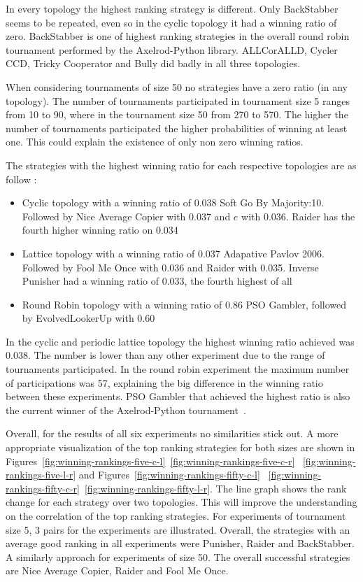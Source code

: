 In every topology the highest ranking strategy is different.
Only BackStabber seems to be repeated, even so in the cyclic
topology it had a winning ratio of zero. BackStabber is one of highest ranking
strategies in the overall round robin tournament performed by the Axelrod-Python
library. ALLCorALLD, Cycler CCD, Tricky Cooperator and Bully did badly in all
three topologies.

When considering tournaments of size 50 no strategies have a zero ratio
(in any topology). The number of tournaments participated in tournament size 5
ranges from 10 to 90, where in the tournament size 50 from 270 to 570. The higher
the number of tournaments participated the higher probabilities of winning at
least one. This could explain the existence of only non zero winning ratios.

The strategies with the highest winning ratio for each respective topologies are
as follow :

\begin{itemize}
	\item Cyclic topology with a winning ratio of 0.038 Soft Go By Majority:10.
	      Followed by Nice Average Copier with 0.037 and \(e\) with 0.036. Raider
	      has the fourth higher winning ratio on 0.034
	\item Lattice topology with a winning ratio of 0.037 Adapative Pavlov 2006.
	      Followed by Fool Me Once with 0.036 and Raider with 0.035. Inverse
	      Punisher had a winning ratio of 0.033, the fourth highest of all
	\item Round Robin topology with a winning ratio of 0.86 PSO Gambler, followed
	      by EvolvedLookerUp with 0.60
\end{itemize}

In the cyclic and periodic lattice topology the highest winning ratio achieved
was 0.038. The number is lower than any other experiment due to the range of
tournaments participated. In the round robin experiment the maximum number of
participations was 57, explaining the big difference in the winning ratio between
these experiments. PSO Gambler that achieved the highest ratio is also the current
winner of the Axelrod-Python tournament~\cite{pso_gambler}.

Overall, for the results of all six experiments no similarities stick out.
A more appropriate visualization of the top ranking strategies for both
sizes are shown in Figures~\ref{fig:winning-rankings-five-c-l}~\ref{fig:winning-rankings-five-c-r}
~\ref{fig:winning-rankings-five-l-r} and Figures~\ref{fig:winning-rankings-fifty-c-l}
~\ref{fig:winning-rankings-fifty-c-r}~\ref{fig:winning-rankings-fifty-l-r}.
The line graph shows the rank change for each strategy over two topologies.
This will improve the understanding on the correlation of the top ranking strategies.
For experiments of tournament size 5, 3
pairs for the experiments are illustrated. Overall, the strategies with an
average good ranking in all experiments were Punisher, Raider and BackStabber.
A similarly approach for experiments of size 50.
The overall successful strategies are Nice Average Copier, Raider and Fool Me Once.

